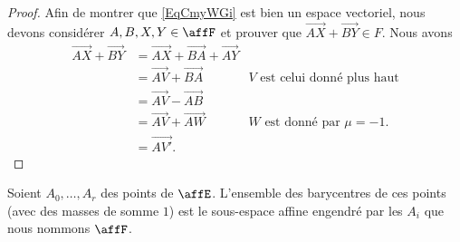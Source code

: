 \begin{proof}
	Afin de montrer que \eqref{EqCmyWGi} est bien un espace vectoriel, nous devons considérer \( A,B,X,Y\in\affF\) et prouver que \( \overrightarrow{ AX }+\overrightarrow{ BY }\in F\). Nous avons
	\begin{subequations}
		\begin{align}
			\overrightarrow{ AX }+\overrightarrow{ BY } & =\overrightarrow{ AX }+\overrightarrow{ BA }+\overrightarrow{ AY }                                          \\
			                                            & =\overrightarrow{ AV }+\overrightarrow{ BA }                       & V\text{ est celui donné plus haut}     \\
			                                            & =\overrightarrow{ AV }-\overrightarrow{ AB }                                                                \\
			                                            & =\overrightarrow{ AV }+\overrightarrow{ AW }                       & W\text{ est donné par } \mu=-1\text{.} \\
			                                            & =\overrightarrow{ AV' }.
		\end{align}
	\end{subequations}
\end{proof}

\begin{proposition}      \label{PropBVbCOS}
	Soient \( A_0,\ldots, A_r\) des points de \( \affE\). L'ensemble des barycentres de ces points (avec des masses de somme \( 1\)) est le sous-espace affine engendré par les \( A_i\) que nous nommons \( \affF\).
\end{proposition}

